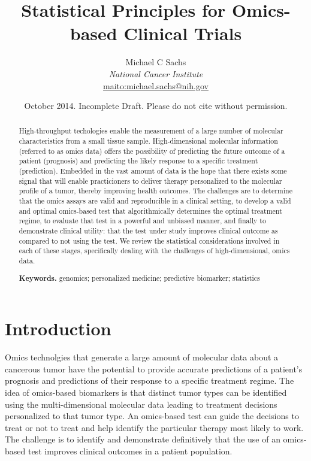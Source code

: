 \documentclass[11pt]{article}
\title{\bigskip \bigskip Statistical Principles for Omics-based Clinical Trials}
\author{\Large Michael C Sachs\vspace{0.05in} \\ \normalsize\emph{National Cancer Institute} \\ \footnotesize \url{maito:michael.sachs@nih.gov}\vspace*{0.2in}\\ }
\date{\footnotesize October 2014. Incomplete Draft. Please do not cite without permission.}
\begin{document}
  
		




\maketitle


\begin{abstract}

\noindent High-throughput techologies enable the measurement of a large number of
molecular characteristics from a small tissue sample. High-dimensional
molecular information (referred to as omics data) offers the possibility
of predicting the future outcome of a patient (prognosis) and predicting
the likely response to a specific treatment (prediction). Embedded in
the vast amount of data is the hope that there exists some signal that
will enable practicioners to deliver therapy personalized to the
molecular profile of a tumor, thereby improving health outcomes. The
challenges are to determine that the omics assays are valid and
reproducible in a clinical setting, to develop a valid and optimal
omics-based test that algorithmically determines the optimal treatment
regime, to evaluate that test in a powerful and unbiased manner, and
finally to demonstrate clinical utility: that the test under study
improves clinical outcome as compared to not using the test. We review
the statistical considerations involved in each of these stages,
specifically dealing with the challenges of high-dimensional, omics
data.

\smallskip
\noindent \textbf{Keywords.} genomics; personalized medicine; predictive biomarker; statistics

\end{abstract}


\section{Introduction}\label{introduction}

Omics technolgies that generate a large amount of molecular data about a
cancerous tumor have the potential to provide accurate predictions of a
patient's prognosis and predictions of their response to a specific
treatment regime. The idea of omics-based biomarkers is that distinct
tumor types can be identified using the multi-dimensional molecular data
leading to treatment decisions personalized to that tumor type. An
omics-based test can guide the decisions to treat or not to treat and
help identify the particular therapy most likely to work. The challenge
is to identify and demonstrate definitively that the use of an
omics-based test improves clinical outcomes in a patient population.
\end{document}

